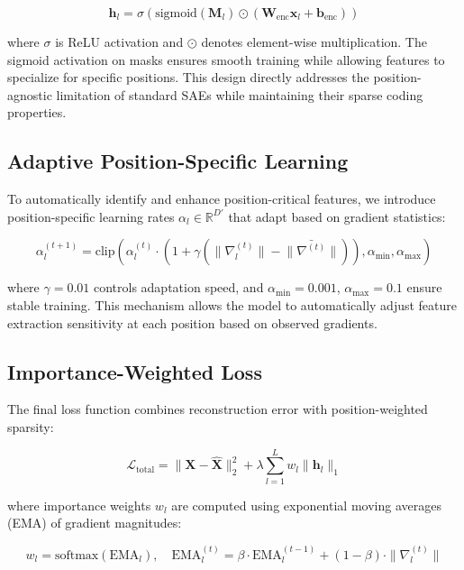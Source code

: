 \documentclass{article} %
\begin{document}
\begin{equation}
    \mathbf{h}_l = \sigma(\text{sigmoid}(\mathbf{M}_l) \odot (\mathbf{W}_{\text{enc}}\mathbf{x}_l + \mathbf{b}_{\text{enc}}))
\end{equation}

where $\sigma$ is ReLU activation and $\odot$ denotes element-wise multiplication. The sigmoid activation on masks ensures smooth training while allowing features to specialize for specific positions. This design directly addresses the position-agnostic limitation of standard SAEs while maintaining their sparse coding properties.

\subsection{Adaptive Position-Specific Learning}
To automatically identify and enhance position-critical features, we introduce position-specific learning rates $\alpha_l \in \mathbb{R}^{D'}$ that adapt based on gradient statistics:

\begin{equation}
    \alpha_l^{(t+1)} = \text{clip}(\alpha_l^{(t)} \cdot (1 + \gamma(\|\nabla_l^{(t)}\| - \bar{\|\nabla^{(t)}\|})), \alpha_{\text{min}}, \alpha_{\text{max}})
\end{equation}

where $\gamma=0.01$ controls adaptation speed, and $\alpha_{\text{min}}=0.001$, $\alpha_{\text{max}}=0.1$ ensure stable training. This mechanism allows the model to automatically adjust feature extraction sensitivity at each position based on observed gradients.

\subsection{Importance-Weighted Loss}
The final loss function combines reconstruction error with position-weighted sparsity:

\begin{equation}
    \mathcal{L}_{\text{total}} = \|\mathbf{X} - \hat{\mathbf{X}}\|_2^2 + \lambda \sum_{l=1}^L w_l \|\mathbf{h}_l\|_1
\end{equation}

where importance weights $w_l$ are computed using exponential moving averages (EMA) of gradient magnitudes:

\begin{equation}
    w_l = \text{softmax}(\text{EMA}_l), \quad \text{EMA}_l^{(t)} = \beta \cdot \text{EMA}_l^{(t-1)} + (1-\beta) \cdot \|\nabla_l^{(t)}\|
\end{equation}
\end{document}
